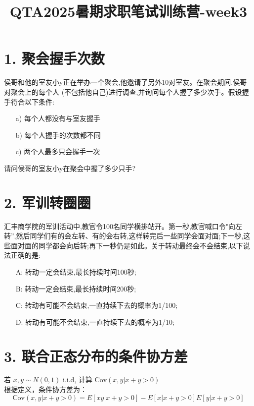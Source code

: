 \documentclass[UTF8]{ctexart}
\title{QTA2025暑期求职笔试训练营-week3}
\author{}
\date{}
\begin{document}
\maketitle
\section*{1. 聚会握手次数}

侯哥和他的室友小y正在举办一个聚会,他邀请了另外10对室友。在聚会期间,侯哥对聚会上的每个人 (不包括他自己)进行调查,并询问每个人握了多少次手。假设握手符合以下条件:
\begin{itemize}
    \item[a)] 每个人都没有与室友握手
    \item[b)] 每个人握手的次数都不同
    \item[c)] 两个人最多只会握手一次
\end{itemize}
请问侯哥的室友小y在聚会中握了多少只手?

\section*{2. 军训转圈圈}

汇丰商学院的军训活动中,教官令100名同学横排站开。第一秒,教官喊口令"向左转”,然后同学们有的会左转、有的会右转,这样转完后一些同学会面对面;下一秒,这些面对面的同学都会向后转;再下一秒仍是如此。关于转动最终会不会结束,以下说法正确的是:
\begin{itemize}
    \item[A:] 转动一定会结束,最长持续时间100秒;
    \item[B:] 转动一定会结束,最长持续时间200秒;
    \item[C:] 转动有可能不会结束,一直持续下去的概率为1/100;
    \item[D:] 转动有可能不会结束,一直持续下去的概率为1/10;
\end{itemize}

\section*{3. 联合正态分布的条件协方差}

若 $x, y \sim N(0,1)$ i.i.d, 计算 $\text{Cov}(x, y | x+y > 0)$
\\

    根据定义，条件协方差为：
    \[
    \text{Cov}(x, y | x+y>0) = E[xy | x+y>0] - E[x | x+y>0]E[y | x+y>0]
    \]
\end{document}
